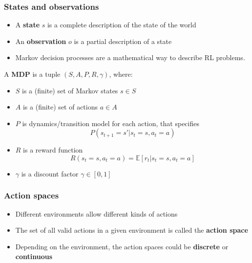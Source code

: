 \documentclass[9pt]{beamer}
\newcommand{\E}{{\mathbb E}}
\begin{document}
\begin{frame}
\frametitle{States and observations}

\begin{itemize}

\item A \textbf{state} $s$ is a complete description of the state of the world
\item An \textbf{observation} $o$ is a partial description of a state
\item Markov decision processes are a mathematical way to describe RL problems. 

\end{itemize}

\begin{definition}
	A \textbf{MDP} is a tuple $(S,A, P, R, \gamma)$, where:
	\begin{itemize}
		\item $S$ is a (finite) set of Markov states $s \in S$
		\item $A$ is a (finite) set of actions $a \in A$
		\item $P$ is dynamics/transition model for each action, that specifies
		\begin{equation}
			P(s_{t+1} =s'|s_t =s,a_t =a)	
		\end{equation}
		\item $R$ is a reward function
		\begin{equation}
			R(s_t =s,a_t =a)=\E[r_t|s_t =s,a_t =a]	
		\end{equation}
		
		\item $\gamma$ is a discount factor $\gamma \in [0,1]$
	\end{itemize}
\end{definition}

\end{frame}




\begin{frame}
	\frametitle{Action spaces}
	\begin{itemize}
		\item Different environments allow different kinds of actions
		\item The set of all valid actions in a given environment is called the \textbf{action space}
		\item Depending on the environment, the action spaces could be \textbf{discrete} or \textbf{continuous}
	\end{itemize}
\end{frame}
\end{document}
